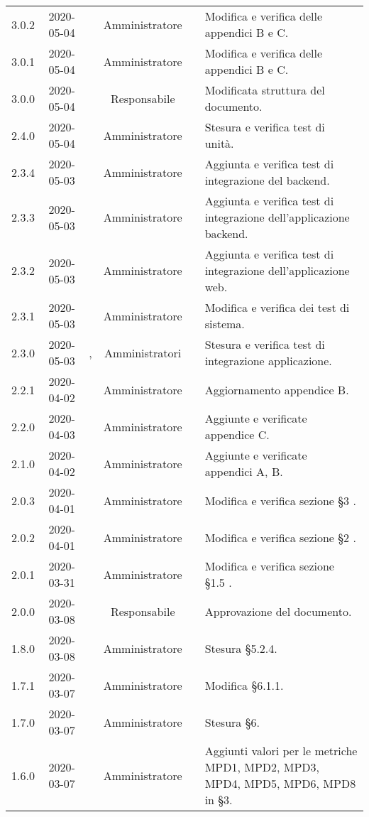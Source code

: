{\begin{longtable}{ c c  C{2.3cm} c C{3cm} C{3.2cm}}
3.0.2 & 2020-05-04 & \PF{} & Amministratore & \AT{} & Modifica e verifica delle appendici B e C. \\
3.0.1 & 2020-05-04 & \PF{} & Amministratore & \AT{} & Modifica e verifica delle appendici B e C. \\
3.0.0 & 2020-05-04 & \DF{} & Responsabile	& \PF{} & Modificata struttura del documento.\\
2.4.0 & 2020-05-04 & \PF{} & Amministratore & \AT{} & Stesura e verifica test di unità. \\
2.3.4 & 2020-05-03 & \CE{} & Amministratore & \AT{} & Aggiunta e verifica test di integrazione del backend. \\
2.3.3 & 2020-05-03 & \PF{} & Amministratore & \AT{} & Aggiunta e verifica test di integrazione dell'applicazione backend. \\
2.3.2 & 2020-05-03 & \PF{} & Amministratore & \AT{} & Aggiunta e verifica test di integrazione dell'applicazione web. \\
2.3.1 & 2020-05-03 & \MC{} & Amministratore & \AT{} & Modifica e verifica dei test di sistema. \\
2.3.0 & 2020-05-03 & \MC{}, \DF{} & Amministratori & \AT{} & Stesura e verifica test di integrazione applicazione. \\
2.2.1 & 2020-04-02 & \PF{} & Amministratore & \AT{} & Aggiornamento appendice B.\\
2.2.0 & 2020-04-03 & \PF{} & Amministratore & \AT{} & Aggiunte e verificate appendice C.\\
2.1.0 & 2020-04-02 & \PF{} & Amministratore & \AT{} & Aggiunte e verificate appendici A, B.\\
2.0.3 & 2020-04-01 & \PF{} & Amministratore & \AT{} & Modifica e verifica sezione §3 .\\
2.0.2 & 2020-04-01 & \PF{} & Amministratore & \AT{} & Modifica e verifica sezione §2 .\\
2.0.1 & 2020-03-31 & \PF{} & Amministratore & \AT{} & Modifica e verifica sezione §1.5 .\\
2.0.0 & 2020-03-08 & \BR{} & Responsabile & \DF{}& Approvazione del documento. \\
1.8.0 & 2020-03-08 & \PF{} & Amministratore & \AT{} & Stesura §5.2.4. \\
1.7.1 & 2020-03-07 & \DF{} & Amministratore & \SE{} & Modifica §6.1.1. \\
1.7.0 & 2020-03-07 & \CE{} & Amministratore & \SE{} & Stesura §6. \\
1.6.0 & 2020-03-07 & \CE{} & Amministratore & \AT{} & Aggiunti valori per le metriche MPD1, MPD2, MPD3, MPD4, MPD5, MPD6, MPD8 in §3. \\

\end{longtable}}
